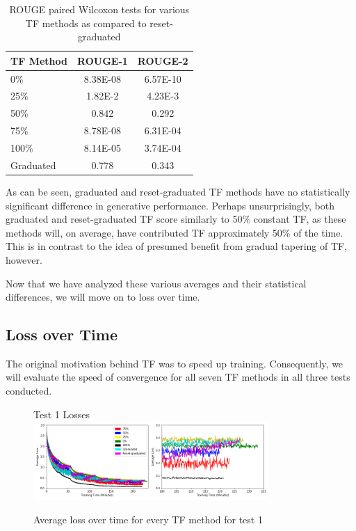 \begin{table}[h]
  \centering
  \begin{tabular}{| l | c | c |}
    \hline
    TF Method & ROUGE-1 & ROUGE-2 \\
    \hline
    0\% & 8.38E-08  & 6.57E-10  \\
    25\% & 1.82E-2  & 4.23E-3  \\
    50\% & 0.842  & 0.292  \\
    75\% & 8.78E-08  & 6.31E-04  \\
    100\% & 8.14E-05  & 3.74E-04  \\
    Graduated & 0.778  & 0.343  \\
    \hline
  \end{tabular}
  \caption{ROUGE paired Wilcoxon tests for various TF methods as compared to reset-graduated}
  \label{tab:pairedrg}
\end{table}

As can be seen, graduated and reset-graduated TF methods have no statistically significant difference in generative performance. Perhaps unsurprisingly, both graduated and reset-graduated TF score similarly to 50\% constant TF, as these methods will, on average, have contributed TF approximately 50\% of the time. This is in contrast to the idea of presumed benefit from gradual tapering of TF, however.

Now that we have analyzed these various averages and their statistical differences, we will move on to loss over time.

\subsection{Loss over Time}\label{loss}
The original motivation behind TF was to speed up training. Consequently, we will evaluate the speed of convergence for all seven TF methods in all three tests conducted.

\begin{figure}[h]
  \centering
  Test 1 Losses\\
  \includegraphics[width=0.8\textwidth]{../plots/test1comb}
  \caption{Average loss over time for every TF method for test 1}
  \label{fig:t1loss}
\end{figure}

